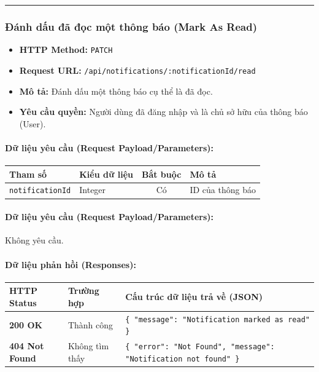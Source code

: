 \documentclass[12pt,a4paper]{article}
\begin{document}
\vskip 0.4cm
\noindent\rule{\textwidth}{0.3pt}
\vskip 0.4cm

\subsubsection{Đánh dấu đã đọc một thông báo (Mark As Read)}
\begin{itemize}[leftmargin=*]
    \item \textbf{HTTP Method:} \texttt{PATCH}
    \item \textbf{Request URL:} \texttt{/api/notifications/:notificationId/read}
    \item \textbf{Mô tả:} Đánh dấu một thông báo cụ thể là đã đọc.
    \item \textbf{Yêu cầu quyền:} Người dùng đã đăng nhập và là chủ sở hữu của thông báo (User).
\end{itemize}

\paragraph{Dữ liệu yêu cầu (Request Payload/Parameters):}
\begin{longtable}{|p{2.8cm}|p{2.2cm}|c|p{7.0cm}|}
\hline
\textbf{Tham số} & \textbf{Kiểu dữ liệu} & \textbf{Bắt buộc} & \textbf{Mô tả} \\ \hline
\endhead
\texttt{notificationId} & Integer & Có & ID của thông báo \\ \hline
\end{longtable}

\paragraph{Dữ liệu yêu cầu (Request Payload/Parameters):}
Không yêu cầu.\\

\paragraph{Dữ liệu phản hồi (Responses):}
\begin{longtable}{|p{2.8cm}|p{3.2cm}|p{8.0cm}|}
\hline
\textbf{HTTP Status} & \textbf{Trường hợp} & \textbf{Cấu trúc dữ liệu trả về (JSON)} \\ \hline
\endhead
\textbf{200 OK} & Thành công & \texttt{\{ "message": "Notification marked as read" \}} \\ \hline
\textbf{404 Not Found} & Không tìm thấy & \texttt{\{ "error": "Not Found", "message": "Notification not found" \}} \\ \hline
\end{longtable}
\end{document}
